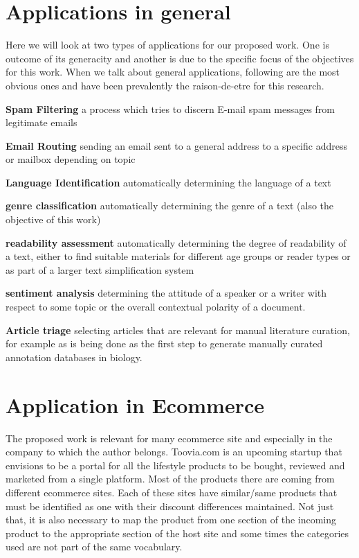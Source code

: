 \documentclass[12pt]{book}
\begin{document}
\section{Applications in general}
Here we will look at two types of applications for our proposed work. One is outcome of its generacity and another is due to the specific focus of the objectives for this work. When we talk about general applications, following are the most obvious ones and
have been prevalently the raison-de-etre for this research.
\begin{itemize*}
  \item \textbf{Spam Filtering} a process which tries to discern E-mail spam messages from legitimate emails
  \item \textbf{Email Routing} sending an email sent to a general address to a specific address or mailbox depending on topic
  \item \textbf{Language Identification} automatically determining the language of a text
  \item \textbf{genre classification} automatically determining the genre of a text (also the objective of this work)
  \item \textbf{readability assessment} automatically determining the degree of readability of a text, either to find suitable materials for different age groups or reader types or as part of a larger text simplification system 
  \item \textbf{sentiment analysis} determining the attitude of a speaker or a writer with respect to some topic or the overall contextual polarity of a document.
  \item \textbf{Article triage} selecting articles that are relevant for manual literature curation, for example as is being done as the first step to generate manually curated annotation databases in biology.
\end{itemize*}

\section{Application in Ecommerce}

The proposed work is relevant for many ecommerce site and especially in the company to which the author belongs. Toovia.com is an upcoming startup that envisions to be a portal for all the lifestyle products to be 
bought, reviewed and marketed from a single platform. Most of the products there are coming from different ecommerce sites. Each of these sites have similar/same products that must be identified as one with their discount differences maintained.
Not just that, it is also necessary to map the product from one section of the incoming product to the appropriate section of the host site and some times the categories used are not part of the same vocabulary.
\end{document}
